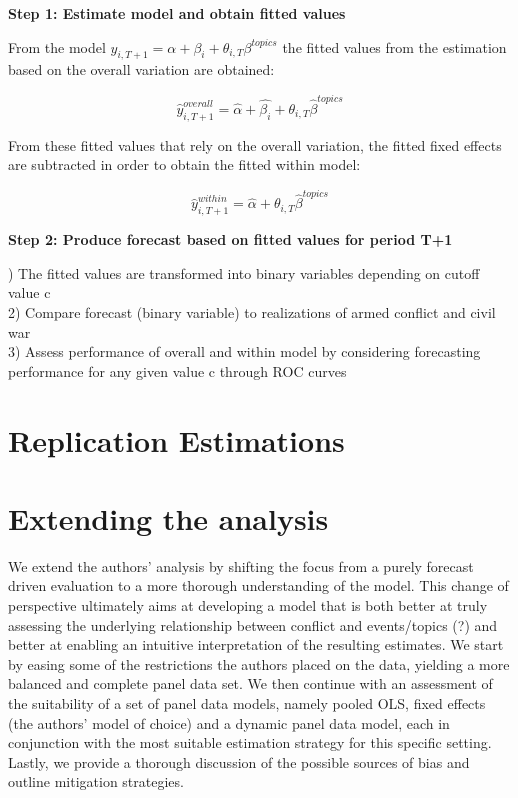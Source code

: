\noindent\textbf{Step 1: Estimate model and obtain fitted values}

\noindent From the model $y_{i,T+1} = \alpha + \beta_{i} + \theta_{i,T}\beta^{topics}$ the fitted values from the estimation based on the overall variation are obtained: 

\begin{equation}
    \hat{y}_{i,T+1}^{overall} = \hat{\alpha} + \hat{\beta_i} + \theta_{i,T}\hat{\beta}^{topics}
\end{equation}

\noindent From these fitted values that rely on the overall variation, the fitted fixed effects are subtracted in order to obtain the fitted within model:

\begin{equation}
    \hat{y}_{i,T+1}^{within} = \hat{\alpha} + \theta_{i,T}\hat{\beta}^{topics}
\end{equation}

\noindent \textbf{Step 2: Produce forecast based on fitted values for period T+1}

) The fitted values are transformed into binary variables depending on cutoff value c\\
2) Compare forecast (binary variable) to realizations of armed conflict and civil war\\
3) Assess performance of overall and within model by considering forecasting performance for any given value c through ROC curves 

\section{Replication Estimations}


\section{Extending the analysis}
We extend the authors' analysis by shifting the focus from a purely forecast driven evaluation to a more thorough understanding of the model.
This change of perspective ultimately aims at developing a model that is both better at truly assessing the underlying relationship between conflict
and events/topics (?) and better at enabling an intuitive interpretation of the resulting estimates.
We start by easing some of the restrictions the authors placed on the data, yielding a more balanced and complete panel data set.
We then continue with an assessment of the suitability of a set of panel data models, namely pooled OLS, fixed effects (the authors' model of choice)
and a dynamic panel data model, each in conjunction with the most suitable estimation strategy for this specific setting.
Lastly, we provide a thorough discussion of the possible sources of bias and outline mitigation strategies.

